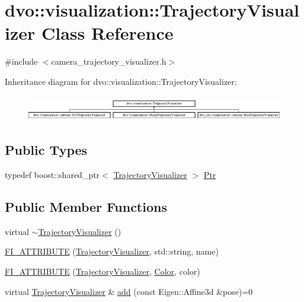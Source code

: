 \hypertarget{classdvo_1_1visualization_1_1_trajectory_visualizer}{}\section{dvo\+:\+:visualization\+:\+:Trajectory\+Visualizer Class Reference}
\label{classdvo_1_1visualization_1_1_trajectory_visualizer}


{\ttfamily \#include $<$camera\+\_\+trajectory\+\_\+visualizer.\+h$>$}

Inheritance diagram for dvo\+:\+:visualization\+:\+:Trajectory\+Visualizer\+:\begin{figure}[H]
\begin{center}
\leavevmode
\includegraphics[height=1.131313cm]{classdvo_1_1visualization_1_1_trajectory_visualizer}
\end{center}
\end{figure}
\subsection*{Public Types}
\begin{DoxyCompactItemize}
\item 
typedef boost\+::shared\+\_\+ptr$<$ \mbox{\hyperlink{classdvo_1_1visualization_1_1_trajectory_visualizer}{Trajectory\+Visualizer}} $>$ \mbox{\hyperlink{classdvo_1_1visualization_1_1_trajectory_visualizer_aac33ef5979fe64ee33409f1afa977fd3}{Ptr}}
\end{DoxyCompactItemize}
\subsection*{Public Member Functions}
\begin{DoxyCompactItemize}
\item 
virtual \mbox{\hyperlink{classdvo_1_1visualization_1_1_trajectory_visualizer_ae0cd566f18de34fd8754ae3a419f84b9}{$\sim$\+Trajectory\+Visualizer}} ()
\item 
\mbox{\hyperlink{classdvo_1_1visualization_1_1_trajectory_visualizer_a037f387986028db6c8f9c18bc080b9c2}{F\+I\+\_\+\+A\+T\+T\+R\+I\+B\+U\+TE}} (\mbox{\hyperlink{classdvo_1_1visualization_1_1_trajectory_visualizer}{Trajectory\+Visualizer}}, std\+::string, name)
\item 
\mbox{\hyperlink{classdvo_1_1visualization_1_1_trajectory_visualizer_a023390bc025a00c0e08da2b91a7a2aec}{F\+I\+\_\+\+A\+T\+T\+R\+I\+B\+U\+TE}} (\mbox{\hyperlink{classdvo_1_1visualization_1_1_trajectory_visualizer}{Trajectory\+Visualizer}}, \mbox{\hyperlink{structdvo_1_1visualization_1_1_color}{Color}}, color)
\item 
virtual \mbox{\hyperlink{classdvo_1_1visualization_1_1_trajectory_visualizer}{Trajectory\+Visualizer}} \& \mbox{\hyperlink{classdvo_1_1visualization_1_1_trajectory_visualizer_ac41106ae7e28c019b03f0aa210c6f0c1}{add}} (const Eigen\+::\+Affine3d \&pose)=0
\end{DoxyCompactItemize}


